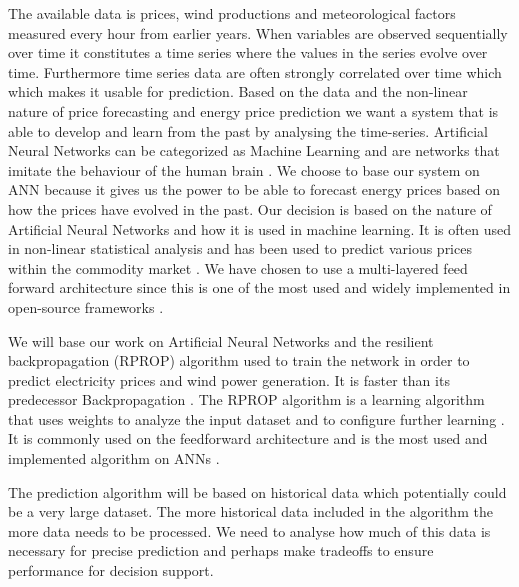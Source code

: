 The available data is prices, wind productions and meteorological factors measured every hour from earlier years. When variables are observed sequentially over time it constitutes a time series \cite[Chapter~7.1.2]{econometrics} where the values in the series evolve over time. Furthermore time series data are often strongly correlated over time which\cite[Chapter~7.1.2]{econometrics} which makes it usable for prediction. Based on the data and the non-linear nature of price forecasting and energy price prediction we want a system that is able to develop and learn from the past by analysing the time-series. Artificial Neural Networks can be categorized as Machine Learning \cite{18} and are networks that imitate the behaviour of the human brain \cite{1}. We choose to base our system on ANN because it gives us the power to be able to forecast energy prices based on how the prices have evolved in the past. Our decision is based on the nature of Artificial Neural Networks and how it is used in machine learning. It is often used in non-linear statistical analysis \cite{16} and has been used to predict various prices within the commodity market \cite{2,3,stockForecasting,pjmForecast}. We have chosen to use a multi-layered feed forward architecture since this is one of the most used and widely implemented in open-source frameworks \cite{17}.

We will base our work on Artificial Neural Networks and the resilient backpropagation (RPROP) algorithm used to train the network in order to predict electricity prices and wind power generation. It is faster than its predecessor Backpropagation \cite{8,15}.  The RPROP algorithm is a learning algorithm that uses weights to analyze the input dataset and to configure further learning \cite{17}. It is commonly used on the feedforward architecture and is the most used and implemented algorithm on ANNs \cite{14,17}.

The prediction algorithm will be based on historical data which potentially could be a very large dataset. The more historical data included in the algorithm the more data needs to be processed. We need to analyse how much of this data is necessary for precise prediction and perhaps make tradeoffs to ensure performance for decision support.